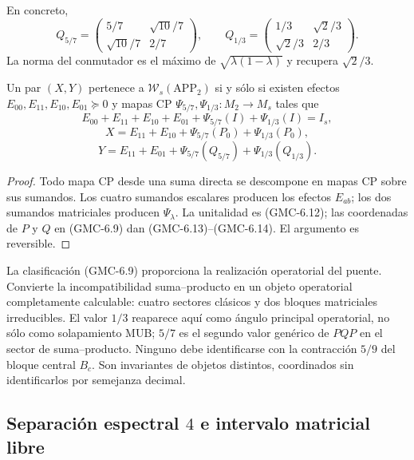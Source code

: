 En concreto,
\[
 Q_{5/7}=
 \begin{pmatrix}5/7&\sqrt{10}/7\\\sqrt{10}/7&2/7\end{pmatrix},
 \qquad
 Q_{1/3}=
 \begin{pmatrix}1/3&\sqrt2/3\\\sqrt2/3&2/3\end{pmatrix}.
 \tag{GMC-6.11}
\]
La norma del conmutador es el máximo de
$\sqrt{\lambda(1-\lambda)}$ y recupera $\sqrt2/3$.

\begin{corollary}
\label{p12-83-c22-s1:gmc:cor:rango-app-d2}
Un par $(X,Y)$ pertenece a $\mathcal W_s(\mathrm{APP}_2)$ si y sólo si
existen efectos
$E_{00},E_{11},E_{10},E_{01}\succeq0$ y mapas CP
$\Psi_{5/7},\Psi_{1/3}:M_2\to M_s$ tales que
\[
 E_{00}+E_{11}+E_{10}+E_{01}
 +\Psi_{5/7}(I)+\Psi_{1/3}(I)=I_s,
 \tag{GMC-6.12}
\]
\[
 X=E_{11}+E_{10}
 +\Psi_{5/7}(P_0)+\Psi_{1/3}(P_0),
 \tag{GMC-6.13}
\]
\[
 Y=E_{11}+E_{01}
 +\Psi_{5/7}(Q_{5/7})+\Psi_{1/3}(Q_{1/3}).
 \tag{GMC-6.14}
\]
\end{corollary}

\begin{proof}
Todo mapa CP desde una suma directa se descompone en mapas CP sobre sus
sumandos. Los cuatro sumandos escalares producen los efectos $E_{ab}$; los
dos sumandos matriciales producen $\Psi_\lambda$. La unitalidad es
\textup{(GMC-6.12)}; las coordenadas de $P$ y $Q$ en \textup{(GMC-6.9)} dan
\textup{(GMC-6.13)}--\textup{(GMC-6.14)}. El argumento es reversible.
\end{proof}

\begin{bridgebox}
La clasificación \textup{(GMC-6.9)} proporciona la realización operatorial del puente. Convierte la
incompatibilidad suma--producto en un objeto operatorial completamente
calculable: cuatro sectores clásicos y dos bloques matriciales irreducibles.
El valor $1/3$ reaparece aquí como ángulo principal operatorial, no sólo como
solapamiento MUB; $5/7$ es el segundo valor genérico de $PQP$ en el sector de
suma--producto. Ninguno debe identificarse con la contracción $5/9$ del bloque
central $B_c$. Son invariantes de objetos distintos, coordinados sin
identificarlos por semejanza decimal.
\end{bridgebox}

\subsection{Separación espectral \texorpdfstring{$4$}{4} e intervalo matricial libre}

